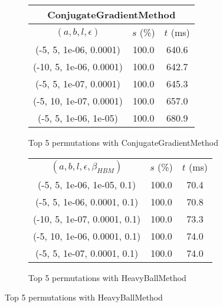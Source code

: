 \begin{figure}[H]
\begin{subfigure}[ht]{.5\textwidth}
\begin{tabular}{|c|c|c|}
\multicolumn{3}{|c|}{ConjugateGradientMethod} \\
\hline
\rowcolor{gray!25}
$(a,b,l,\epsilon)$ & $s$ (\%) & $t$ (ms) \\
\hline
(-5, 5, 1e-06, 0.0001) & 100.0 & 640.6 \\
(-10, 5, 1e-06, 0.0001) & 100.0 & 642.7 \\
(-5, 5, 1e-07, 0.0001) & 100.0 & 645.3 \\
(-5, 10, 1e-07, 0.0001) & 100.0 & 657.0 \\
(-5, 5, 1e-06, 1e-05) & 100.0 & 680.9 \\
\hline
\end{tabular}
\caption{Top 5 permutations with ConjugateGradientMethod}
\label{subfig:param_comp_NegativeEntropy_ConjugateGradientMethod_DichotomousSearch}
\end{subfigure}
\hfill
\begin{subfigure}[ht]{.5\textwidth}
\begin{tabular}{|c|c|c|}
\hline
\rowcolor{gray!25}
\multicolumn{3}{|c|}{HeavyBallMethod} \\
\hline
\rowcolor{gray!25}
$(a,b,l,\epsilon,\beta_{HBM})$ & $s$ (\%) & $t$ (ms) \\
\hline
(-5, 5, 1e-06, 1e-05, 0.1) & 100.0 & 70.4 \\
(-5, 5, 1e-06, 0.0001, 0.1) & 100.0 & 70.8 \\
(-10, 5, 1e-07, 0.0001, 0.1) & 100.0 & 73.3 \\
(-5, 10, 1e-06, 0.0001, 0.1) & 100.0 & 74.0 \\
(-5, 5, 1e-07, 0.0001, 0.1) & 100.0 & 74.0 \\
\hline
\end{tabular}
\caption{Top 5 permutations with HeavyBallMethod}
\label{subfig:param_comp_NegativeEntropy_HeavyBallMethod_DichotomousSearch}
\end{subfigure}
\end{figure}
\restoregeometry

